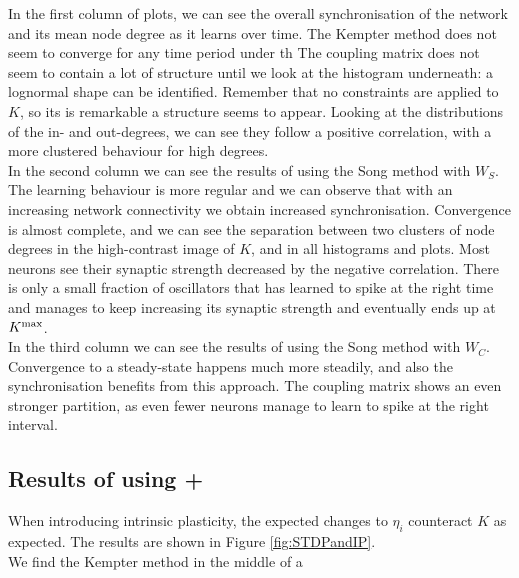 In the first column of plots, we can see the overall synchronisation of the network and its mean node degree as it learns over time. The Kempter method does not seem to converge for any time period under th
The coupling matrix does not seem to contain a lot of structure until we look at the histogram underneath: a lognormal shape can be identified. Remember that no constraints are applied to $K$, so its is remarkable a structure seems to appear. Looking at the distributions of the in- and out-degrees, we can see they follow a positive correlation, with a more clustered behaviour for high degrees. \\

In the second column we can see the results of using the Song method with $W_S$. The learning behaviour is more regular and we can observe that with an increasing network connectivity we obtain increased synchronisation. Convergence is almost complete, and we can see the separation between two clusters of node degrees in the high-contrast image of $K$, and in all histograms and plots. Most neurons see their synaptic strength decreased by the negative correlation. There is only a small fraction of oscillators that has learned to spike at the right time and manages to keep increasing its synaptic strength and eventually ends up at $K^{\rm max}$. \\%

In the third column we can see the results of using the Song method with $W_C$. Convergence to a steady-state happens much more steadily, and also the synchronisation benefits from this approach. The coupling matrix shows an even stronger partition, as even fewer neurons manage to learn to spike at the right interval.



\subsection{Results of using \STDP + \IP}
When introducing intrinsic plasticity, the expected changes to $\eta_i$ counteract $K$ as expected. The results are shown in Figure \ref{fig:STDPandIP}. \\

We find the Kempter method in the middle of a 

